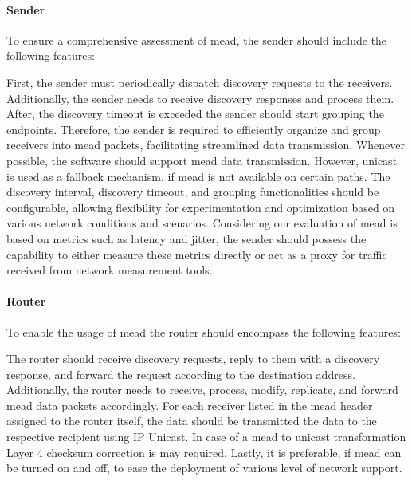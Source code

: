 \paragraph{Sender} %
\label{par:Sender}
To ensure a comprehensive assessment of \gls{mead}, the sender should include the
    following features:

First, the sender must periodically dispatch discovery requests to the
    receivers.
Additionally, the sender needs to receive discovery responses and process them.
After, the discovery timeout is exceeded the sender should start grouping the
    endpoints.
Therefore, the sender is required to efficiently organize and group receivers
    into \gls{mead} packets, facilitating streamlined data transmission.
Whenever possible, the software should support \gls{mead} data transmission.
However, unicast is used as a fallback mechanism, if \gls{mead} is not available
    on certain paths.
The discovery interval, discovery timeout, and grouping functionalities should
    be configurable, allowing flexibility for experimentation and optimization
    based on various network conditions and scenarios.
Considering our evaluation of \gls{mead} is based on metrics such as latency and
    jitter, the sender should possess the capability to either measure these
    metrics directly or act as a proxy for traffic received from network
    measurement tools.

\paragraph{Router} %
\label{par:Router}
To enable the usage of \gls{mead} the router should encompass the following
    features:

The router should receive discovery requests, reply to them with a discovery
    response, and forward the request according to the destination address.
Additionally, the router needs to receive, process, modify, replicate, and
    forward \gls{mead} data packets accordingly.
For each receiver listed in the \gls{mead} header assigned to the router itself,
    the data should be transmitted the data to the respective recipient using
    IP Unicast.
In case of a \gls{mead} to unicast transformation Layer 4 checksum correction is
    may required.
Lastly, it is preferable, if \gls{mead} can be turned on and off, to ease the
    deployment of various level of network support.

